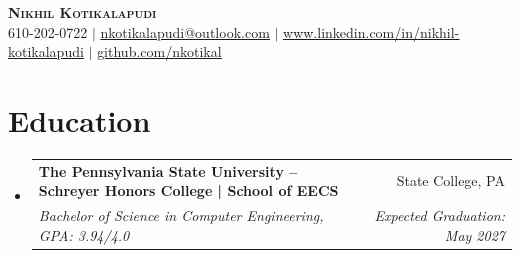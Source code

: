 \documentclass[letterpaper,11pt]{article}
\makeatletter
\newcommand{\resumeSubheading}[4]{
  \vspace{-2pt}\item
    \begin{tabular*}{0.97\textwidth}[t]{l@{\extracolsep{\fill}}r}
      \textbf{#1} & #2 \\
      \textit{\small#3} & \textit{\small #4} \\
    \end{tabular*}\vspace{-7pt}
}
\newcommand{\resumeSubHeadingListStart}{\begin{itemize}[leftmargin=0.15in, label={}]}
\newcommand{\resumeSubHeadingListEnd}{\end{itemize}}
\makeatother
\begin{document}
\begin{center}
    \textbf{\Huge \scshape Nikhil Kotikalapudi} \\ \vspace{1pt}
    \small 610-202-0722 $|$
    \href{mailto:nkotikalapudi@outlook.com}{\underline{nkotikalapudi@outlook.com}} $|$
    \href{https://www.linkedin.com/in/nikhil-kotikalapudi}{\underline{www.linkedin.com/in/nikhil-kotikalapudi}} $|$
    \href{https://github.com/nkotikal}{\underline{github.com/nkotikal}}
\end{center}

\section{Education}
  \resumeSubHeadingListStart
    \resumeSubheading
      {The Pennsylvania State University – Schreyer Honors College | School of EECS}{State College, PA}
      {Bachelor of Science in Computer Engineering, GPA: 3.94/4.0}{Expected Graduation: May 2027}
  \resumeSubHeadingListEnd

\end{document}
